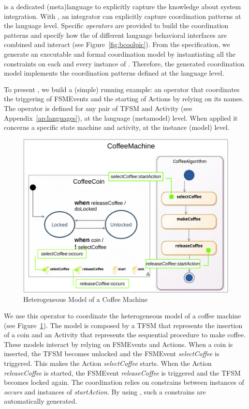 
\bcool is a dedicated (meta)language to explicitly capture the knowledge about system integration. With \bcool, an integrator can explicitly capture coordination patterns at the language level. Specific \emph{operators} are provided to build the coordination patterns and specify how the \dse of different language behavioral interfaces are combined and interact (see Figure~\ref{fig:bcoolpic}). From the \bcool specification, we generate an executable and formal coordination model by instantiating all the constraints on each and every instance of \dse. Therefore, the generated coordination model implements the coordination patterns defined at the language level.  

To present \bcool, we build a (simple) running example: an operator that coordinates the triggering of FSMEvents and the starting of Actions by relying on its names. The operator is defined for any pair of TFSM and Activity (see Appendix~\ref{ap:languages}), at the language (metamodel) level. When applied it concerns a specific state machine and activity, at the instance (model) level. 

\begin{figure}
	\center
	\includegraphics[width=.5\columnwidth]{bcool/figs/models.pdf}
	\caption{Heterogeneous Model of a Coffee Machine}
	\label{fig:runningexample}
\end{figure}

We use this operator to coordinate the heterogeneous model of a coffee machine (see Figure~\ref{fig:runningexample}). The model is composed by a TFSM that represents the insertion of a coin and an Activity that represents the sequential procedure to make coffee. These models interact by relying on FSMEvents and Actions. When a coin is inserted, the TFSM becomes unlocked and the FSMEvent \emph{selectCoffee} is triggered. This makes the Action \emph{selectCoffee} starts. When the Action \emph{releaseCoffee} is started, the FSMEvent \emph{releaseCoffee} is triggered and the TFSM becomes locked again. The coordination relies on constrains between instances of \dse \emph{occurs} and instances of \dse \emph{startAction}. By using \bcool, such a constrains are automatically generated.  
